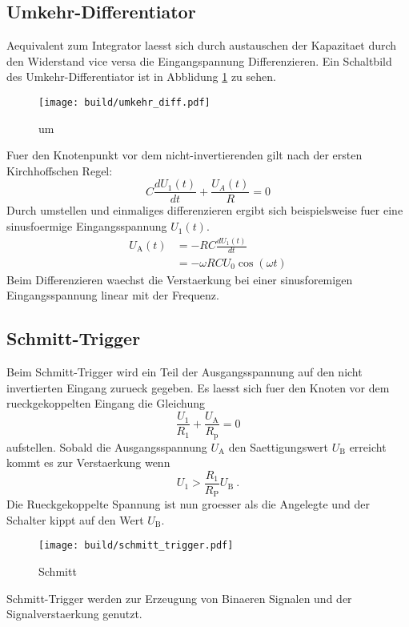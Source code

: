 \subsection{Umkehr-Differentiator}%
\label{sub:umkehr_differentiator}
Aequivalent zum Integrator laesst sich durch austauschen der Kapazitaet durch
den Widerstand vice versa die Eingangspannung Differenzieren.
Ein Schaltbild des Umkehr-Differentiator ist in Abblidung \ref{fig:diff} zu
sehen.
\begin{figure}[h]
		\centering
		\texttt{[image: build/umkehr\_diff.pdf]}
		\caption{um}
		\label{fig:diff}
\end{figure}
Fuer den Knotenpunkt vor dem nicht-invertierenden gilt nach der ersten
Kirchhoffschen Regel:
\begin{equation}
		C \frac{d U_1(t)}{dt} + \frac{U_A(t)}{R} = 0
\end{equation}
Durch umstellen und einmaliges differenzieren ergibt sich beispielsweise fuer
eine sinusfoermige Eingangsspannung $U_1(t)$.
\begin{align}
		U_\text{A}(t) &= - RC \frac{dU_1(t)}{dt} \\
				   &= - \omega R C U_0 \cos(\omega t)
\end{align}
Beim Differenzieren waechst die Verstaerkung bei einer sinusforemigen
Eingangsspannung linear mit der Frequenz.

\subsection{Schmitt-Trigger}%
\label{sub:schmitt_trigger}

Beim Schmitt-Trigger wird ein Teil der Ausgangsspannung auf den nicht
invertierten Eingang zurueck gegeben.
Es laesst sich fuer den Knoten vor dem rueckgekoppelten Eingang die Gleichung 
\begin{equation}
		\frac{U_1}{R_1} + \frac{U_\text{A}}{R_\text{p}} = 0
\end{equation}
aufstellen.
Sobald die Ausgangsspannung $U_\text{A}$ den Saettigungswert $U_\text{B}$ erreicht kommt es zur
Verstaerkung wenn 
\begin{equation}
		\label{eq:schmitt}
		U_1 > \frac{R_1}{R_\text{P}} U_\text{B} \ .
\end{equation}
Die Rueckgekoppelte Spannung ist nun groesser als die Angelegte und der Schalter
kippt auf den Wert $U_\text{B}$.
\begin{figure}[h]
		\centering
		\texttt{[image: build/schmitt\_trigger.pdf]}
		\caption{Schmitt}
		\label{fig:}
\end{figure}
Schmitt-Trigger werden zur Erzeugung von Binaeren Signalen und der
Signalverstaerkung genutzt.

